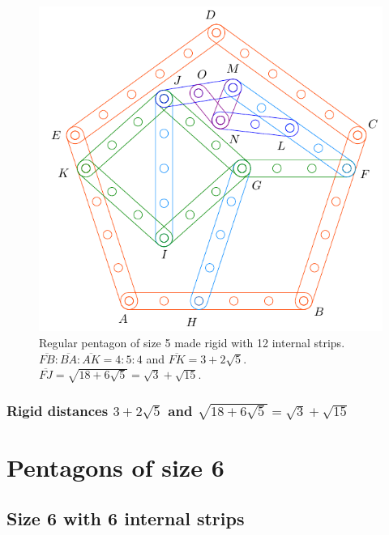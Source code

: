 \documentclass[11pt]{article}
\begin{document}
\begin{figure}[H]
\centering
\includegraphics[scale=0.9]{5/penta5-12a}
\caption{Regular pentagon of size 5 made rigid with 12 internal strips. $\overline{FB} : \overline{BA} : \overline{AK} = 4:5:4$ and $\overline{FK} = 3 + 2\sqrt5$. $\overline{FJ} = \sqrt{18+6\sqrt5} = \sqrt3 + \sqrt{15}$.}
\label{fig:penta5-12a}
\end{figure}

\subsubsection{Rigid distances $3+2\sqrt5$ and $\sqrt{18+6\sqrt5} = \sqrt3 + \sqrt{15}$}



\section{Pentagons of size 6}

\subsection{Size 6 with 6 internal strips}
\end{document}
